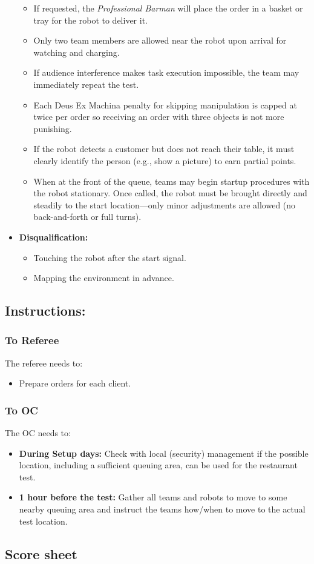 \begin{itemize}
\begin{itemize}
		\item If requested, the \textit{Professional Barman} will place the order in a basket or tray for the robot to deliver it.
		\item Only two team members are allowed near the robot upon arrival for watching and charging.
		\item If audience interference makes task execution impossible, the team may immediately repeat the test.
		\item Each Deus Ex Machina penalty for skipping manipulation is capped at twice per order so receiving an order with three objects is not more punishing.
		\item If the robot detects a customer but does not reach their table, it must clearly identify the person (e.g., show a picture) to earn partial points.
		\item When at the front of the queue, teams may begin startup procedures with the robot stationary. Once called, the robot must be brought directly and steadily to the start location—only minor adjustments are allowed (no back-and-forth or full turns).
	\end{itemize}
	\item \textbf{Disqualification:}
	\begin{itemize}
		\item Touching the robot after the start signal.
		\item Mapping the environment in advance.
	\end{itemize}
\end{itemize}

\subsection*{Instructions:}

\subsubsection*{To Referee}

The referee needs to:
\begin{itemize}
	\item Prepare orders for each client.
\end{itemize}

\subsubsection*{To OC}
The OC needs to:
\begin{itemize}[nosep]
	\item \textbf{During Setup days:} Check with local (security) management if the possible location, including a sufficient queuing area, can be used for the restaurant test.
	\item \textbf{1 hour before the test:} Gather all teams and robots to move to some nearby queuing area and instruct the teams how/when to move to the actual test location.
\end{itemize}

\newpage
\subsection*{Score sheet}


\cleardoublepage{}

